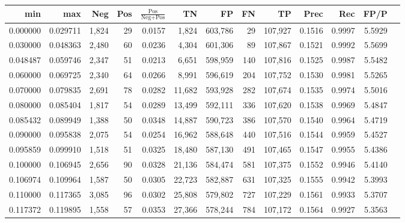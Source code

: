\begin{tabular}{rrrrrrrrrrrrr}
\toprule
     min &      max &   Neg & Pos & $\frac{\text{Pos}}{\text{Neg}+\text{Pos}}$ &      TN &      FP &      FN &      TP &   Prec &    Rec &   FP/P \\
\midrule
0.000000 & 0.029711 & 1,824 &  29 &                                     0.0157 &   1,824 & 603,786 &      29 & 107,927 & 0.1516 & 0.9997 & 5.5929 \\
0.030000 & 0.048363 & 2,480 &  60 &                                     0.0236 &   4,304 & 601,306 &      89 & 107,867 & 0.1521 & 0.9992 & 5.5699 \\
0.048487 & 0.059746 & 2,347 &  51 &                                     0.0213 &   6,651 & 598,959 &     140 & 107,816 & 0.1525 & 0.9987 & 5.5482 \\
0.060000 & 0.069725 & 2,340 &  64 &                                     0.0266 &   8,991 & 596,619 &     204 & 107,752 & 0.1530 & 0.9981 & 5.5265 \\
0.070000 & 0.079835 & 2,691 &  78 &                                     0.0282 &  11,682 & 593,928 &     282 & 107,674 & 0.1535 & 0.9974 & 5.5016 \\
0.080000 & 0.085404 & 1,817 &  54 &                                     0.0289 &  13,499 & 592,111 &     336 & 107,620 & 0.1538 & 0.9969 & 5.4847 \\
0.085432 & 0.089949 & 1,388 &  50 &                                     0.0348 &  14,887 & 590,723 &     386 & 107,570 & 0.1540 & 0.9964 & 5.4719 \\
0.090000 & 0.095838 & 2,075 &  54 &                                     0.0254 &  16,962 & 588,648 &     440 & 107,516 & 0.1544 & 0.9959 & 5.4527 \\
0.095859 & 0.099910 & 1,518 &  51 &                                     0.0325 &  18,480 & 587,130 &     491 & 107,465 & 0.1547 & 0.9955 & 5.4386 \\
0.100000 & 0.106945 & 2,656 &  90 &                                     0.0328 &  21,136 & 584,474 &     581 & 107,375 & 0.1552 & 0.9946 & 5.4140 \\
0.106974 & 0.109964 & 1,587 &  50 &                                     0.0305 &  22,723 & 582,887 &     631 & 107,325 & 0.1555 & 0.9942 & 5.3993 \\
0.110000 & 0.117365 & 3,085 &  96 &                                     0.0302 &  25,808 & 579,802 &     727 & 107,229 & 0.1561 & 0.9933 & 5.3707 \\
0.117372 & 0.119895 & 1,558 &  57 &                                     0.0353 &  27,366 & 578,244 &     784 & 107,172 & 0.1564 & 0.9927 & 5.3563 \\

\end{tabular}
